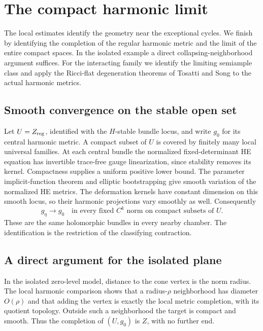\section{The compact harmonic limit}\label{sec:global-completion}

The local estimates identify the geometry near the
exceptional cycles. We finish by identifying the
completion of the regular harmonic metric and the
limit of the entire compact spaces. In the isolated
example a direct collapsing-neighborhood argument
suffices. For the interacting family we identify
the limiting semiample class and apply the
Ricci-flat degeneration theorems of Tosatti and
Song to the actual harmonic metrics.

\subsection{Smooth convergence on the stable open set}
Let $U=Z_{\rm reg}$, identified with the
$H$-stable bundle locus, and write $g_0$ for its
central harmonic metric. A compact subset of
$U$ is covered by finitely many local universal
families. At each central bundle the normalized
fixed-determinant HE equation has invertible
trace-free gauge linearization, since stability
removes its kernel. Compactness supplies a
uniform positive lower bound. The parameter
implicit-function theorem and elliptic
bootstrapping give smooth variation of the
normalized HE metrics. The deformation kernels
have constant dimension on this smooth locus,
so their harmonic projections vary smoothly
as well. Consequently
\begin{equation}\label{eq:regular-smooth-limit}
 g_\eta\longrightarrow g_0
 \quad\text{in every fixed }C^k\text{ norm on compact subsets of }U.
\end{equation}
These are the same holomorphic bundles in every
nearby chamber. The identification is the
restriction of the classifying contraction.

\subsection{A direct argument for the isolated plane}
In the isolated zero-level model, distance to
the cone vertex is the norm radius. The local
harmonic comparison shows that a radius-$\rho$
neighborhood has diameter $O(\rho)$ and that
adding the vertex is exactly the local metric
completion, with its quotient topology.
Outside such a neighborhood the target is
compact and smooth. Thus the completion of
$(U,g_0)$ is $Z$, with no further end.

